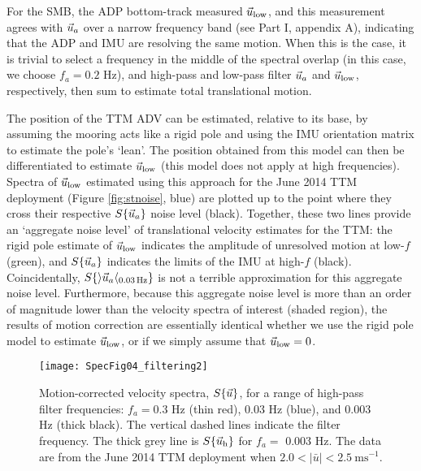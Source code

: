 For the SMB, the ADP bottom-track measured $\vec{u}_\mathrm{low}$, and this measurement agrees with $\vec{u}_a$ over a narrow frequency band (see Part I, appendix A), indicating that the ADP and IMU are resolving the same motion. When this is the case, it is trivial to select a frequency in the middle of the spectral overlap (in this case, we choose $f_a=0.2$ Hz), and high-pass and low-pass filter $\vec{u}_a$ and $\vec{u}_\mathrm{low}$, respectively, then sum to estimate total translational motion.

The position of the TTM ADV can be estimated, relative to its base, by assuming the mooring acts like a rigid pole and using the IMU orientation matrix to estimate the pole's `lean'. The position obtained from this model can then be differentiated to estimate $\vec{u}_\mathrm{low}$ (this model does not apply at high frequencies). Spectra of $\vec{u}_\mathrm{low}$ estimated using this approach for the June 2014 TTM deployment (Figure \ref{fig:stnoise}, blue) are plotted up to the point where they cross their respective $S\{\vec{u}_a\}$ noise level (black).  Together, these two lines provide an `aggregate noise level' of translational velocity estimates for the TTM: the rigid pole estimate of $\vec{u}_\mathrm{low}$ indicates the amplitude of unresolved motion at low-$f$ (green), and $S\{\vec{u}_a\}$ indicates the limits of the IMU at high-$f$ (black). Coincidentally, $S\{\rangle\vec{u}_a\langle_{0.03\,\mathrm{Hz}}\}$ is not a terrible approximation for this aggregate noise level. Furthermore, because this aggregate noise level is more than an order of magnitude lower than the velocity spectra of interest (shaded region), the results of motion correction are essentially identical whether we use the rigid pole model to estimate $\vec{u}_\mathrm{low}$, or if we simply assume that $\vec{u}_\mathrm{low} = 0$. 


\begin{figure}[t]
  \centering
  \texttt{[image: SpecFig04\_filtering2]}
  \caption{Motion-corrected velocity spectra, $S\{\vec{u}\}$, for a range of high-pass filter frequencies: $f_a= 0.3$ Hz (thin red), 0.03 Hz (blue), and 0.003 Hz (thick black). The vertical dashed lines indicate the filter frequency. The thick grey line is $S\{\vec{u}_{\mathrm{h}}\}$ for $f_a=$ 0.003 Hz. The data are from the June 2014 TTM deployment when $2.0 < |\bar{u}| < 2.5\ \mathrm{ms^{-1}}$.
}
  \label{fig:filts}
\end{figure}

